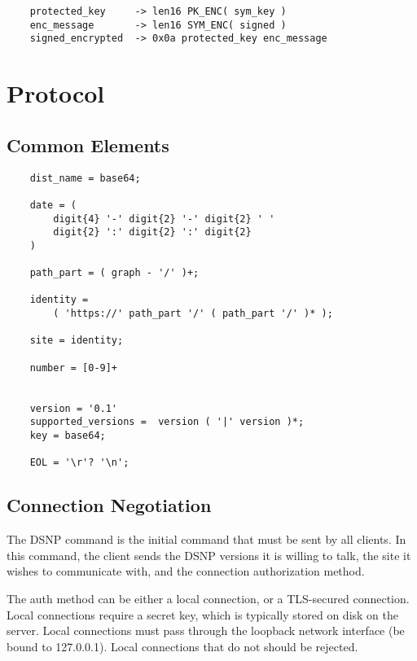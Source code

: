\documentclass[letterpaper,11pt,oneside]{article}
\begin{document}
\vspace{10pt}
\begin{verbatim}
    protected_key     -> len16 PK_ENC( sym_key )
    enc_message       -> len16 SYM_ENC( signed )
    signed_encrypted  -> 0x0a protected_key enc_message
\end{verbatim}
\vspace{10pt}

%
%

\section{Protocol}

\subsection{Common Elements}

\vspace{10pt}
\begin{verbatim}
    dist_name = base64;

    date = (
        digit{4} '-' digit{2} '-' digit{2} ' ' 
        digit{2} ':' digit{2} ':' digit{2} 
    )

    path_part = ( graph - '/' )+;

    identity = 
        ( 'https://' path_part '/' ( path_part '/' )* );

    site = identity;

    number = [0-9]+           


    version = '0.1'
    supported_versions =  version ( '|' version )*;
    key = base64;

    EOL = '\r'? '\n';
\end{verbatim}

\subsection{Connection Negotiation}

The DSNP command is the initial command that must be sent by all clients. In
this command, the client sends the DSNP versions it is willing to talk, the
site it wishes to communicate with, and the connection authorization method.

The auth method can be either a local connection, or a TLS-secured connection.
Local connections require a secret key, which is typically stored on disk on
the server. Local connections must pass through the loopback network interface
(be bound to 127.0.0.1). Local connections that do not should be rejected.
\end{document}
